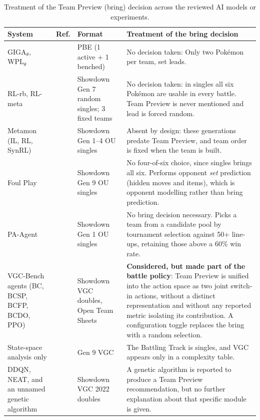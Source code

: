 \documentclass[conference]{IEEEtran}
\begin{document}
\begin{table}[!t]
\centering
\caption{Treatment of the Team Preview (bring) decision across the reviewed AI models or experiments.}
\label{tab:bring}
\scriptsize
\setlength{\tabcolsep}{3pt}
\renewcommand{\arraystretch}{1.15}
\begin{tabular}{@{}p{3.3cm}p{1.6cm}p{3.4cm}p{8.2cm}@{}}
\toprule
\textbf{System} & \textbf{Ref.} & \textbf{Format} & \textbf{Treatment of the bring decision} \\
\midrule
GIGA$_\theta$, WPL$_\theta$ & \cite{simoes2020} & PBE (1 active + 1 benched) & No decision taken: Only two Pokémon per team, set leads.\\
\addlinespace
RL-rb, RL-meta & \cite{huang2019} & Showdown Gen 7  random singles; 3 fixed teams& No decision taken: in singles all six Pok\'emon are usable in every battle. Team Preview is never mentioned and lead is forced random.\\
\addlinespace
Metamon (IL, RL, SynRL) & \cite{grigsby2025} & Showdown Gen 1--4 OU singles & Absent by design: these generations predate Team Preview, and team order is fixed when the team is built. \\
\addlinespace
Foul Play & \cite{karten2026} & Showdown Gen 9 OU singles & No four-of-six choice, since singles brings all six. Performs opponent \emph{set} prediction (hidden moves and items), which is opponent modelling rather than bring prediction. \\
\addlinespace
PA-Agent & \cite{karten2026} & Showdown Gen 1 OU singles & No bring decision necessary. Picks a team from a candidate pool by tournament selection against 50+ line-ups, retaining those above a 60\% win rate.\\
\addlinespace
VGC-Bench agents (BC, BCSP, BCFP, BCDO, PPO) & \cite{angliss2026} & Showdown VGC doubles, Open Team Sheets & \textbf{Considered, but made part of the battle policy}: Team Preview is unified into the action space as two joint switch-in actions, without a distinct representation and without any reported metric isolating its contribution. A configuration toggle replaces the bring with a random selection.\\
\addlinespace
State-space analysis only & \cite{karten2026} & Gen 9 VGC & The Battling Track is singles, and VGC appears only in a complexity table.\\
\addlinespace
DDQN, NEAT, and an unnamed genetic algorithm & \cite{rodriguez2024} & Showdown VGC 2022 doubles & A genetic algorithm is reported to produce a Team Preview recommendation, but no further explanation about that specific module is given.\\

\end{tabular}
\end{table}
\end{document}
